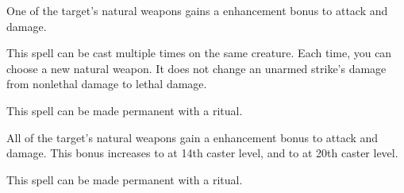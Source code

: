 \begin{spellfooter}
\begin{spellheader}
\end{spellheader}
\begin{spellcontent}
    \begin{spelltargetinginfo}
    \end{spelltargetinginfo}
    \begin{spelleffects}
        \spelleffect One of the target's natural weapons gains a  enhancement bonus to attack and damage. \spellbonusscalingdescription
        \spelldur \durshort
    \end{spelleffects}
\end{spellcontent}
\begin{spellfooter}
    \spellnotes This spell can be cast multiple times on the same creature. Each time, you can choose a new natural weapon. It does not change an unarmed strike's damage from nonlethal damage to lethal damage.

    This spell can be made permanent with a  ritual.
\end{spellfooter}

\begin{spellheader}
\end{spellheader}
\begin{spellcontent}
    \begin{spelltargetinginfo}
    \end{spelltargetinginfo}
    \begin{spelleffects}
        \spelleffect All of the target's natural weapons gain a  enhancement bonus to attack and damage. This bonus increases to  at 14th caster level, and to  at 20th caster level.
        \spelldur \durshort
    \end{spelleffects}
\end{spellcontent}
\begin{spellfooter}
    \spellnotes This spell can be made permanent with a  ritual.
\end{spellfooter}


\end{spellfooter}
